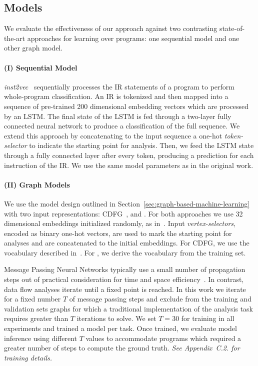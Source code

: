 \subsection{Models}%
\label{subsubsec:dataflow_models}

We evaluate the effectiveness of our approach against two contrasting
state-of-the-art approaches for learning over programs: one sequential model and
one other graph model.

\paragraph{(I) Sequential Model}%
\emph{inst2vec}~\citep{Ben-nun2018} sequentially processes the IR statements of
a program to perform whole-program classification. An IR is tokenized and then
mapped into a sequence of pre-trained 200 dimensional embedding vectors which
are processed by an LSTM. The final state of the LSTM is fed through a two-layer
fully connected neural network to produce a classification of the full sequence.
We extend this approach by concatenating to the input sequence a one-hot
\emph{token-selector} to indicate the starting point for analysis. Then, we feed
the LSTM state through a fully connected layer after every token, producing a
prediction for each instruction of the IR. We use the same model parameters as
in the original work.

\paragraph{(II) Graph Models}%
We use the model design outlined in
Section~\ref{sec:graph-based-machine-learning} with two input representations:
CDFG~\citep{Brauckmann2020}, and \programl. For both approaches we use 32
dimensional embeddings initialized randomly, as in~\citet{Brauckmann2020}. Input
\emph{vertex-selectors}, encoded as binary one-hot vectors, are used to mark the
starting point for analyses and are concatenated to the initial embeddings. For
CDFG, we use the vocabulary described in~\citet{Brauckmann2020}. For \programl,
we derive the vocabulary from the training set.

Message Passing Neural Networks typically use a small number of propagation
steps out of practical consideration for time and space
efficiency~\citep{Gilmer2017,Brauckmann2020}. In contrast, data flow analyses
iterate until a fixed point is reached. In this work we iterate for a fixed
number $T$ of message passing steps and exclude from the training and validation
sets graphs for which a traditional implementation of the analysis task requires
greater than $T$ iterations to solve. We set $T = 30$ for training in all
experiments and trained a model per task. Once trained, we evaluate model
inference using different $T$ values to accommodate programs which required a
greater number of steps to compute the ground truth. \emph{See Appendix~C.2. for
training details.}

